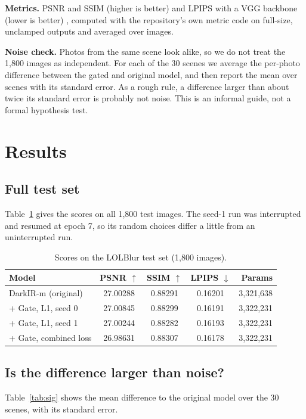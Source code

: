 \documentclass[conference]{IEEEtran}
\begin{document}
\textbf{Metrics.} PSNR and SSIM (higher is better) \cite{ssim} and LPIPS with a VGG backbone (lower is better) \cite{lpips}, computed with the repository's own metric code on full-size, unclamped outputs and averaged over images.

\textbf{Noise check.} Photos from the same scene look alike, so we do not treat the 1{,}800 images as independent. For each of the 30 scenes we average the per-photo difference between the gated and original model, and then report the mean over scenes with its standard error. As a rough rule, a difference larger than about twice its standard error is probably not noise. This is an informal guide, not a formal hypothesis test.

\section{Results}
\subsection{Full test set}
Table~\ref{tab:main} gives the scores on all 1{,}800 test images. The seed-1 run was interrupted and resumed at epoch 7, so its random choices differ a little from an uninterrupted run.

\begin{table}[t]
\caption{Scores on the LOLBlur test set (1{,}800 images).}
\label{tab:main}
\centering
\footnotesize
\setlength{\tabcolsep}{3.5pt}
\begin{tabular}{lcccr}
\toprule
Model & PSNR $\uparrow$ & SSIM $\uparrow$ & LPIPS $\downarrow$ & Params \\
\midrule
DarkIR-m (original) & 27.00288 & 0.88291 & 0.16201 & 3,321,638 \\
+ Gate, L1, seed 0 & 27.00845 & 0.88299 & 0.16191 & 3,322,231 \\
+ Gate, L1, seed 1 & 27.00244 & 0.88282 & 0.16193 & 3,322,231 \\
+ Gate, combined loss & 26.98631 & 0.88307 & 0.16178 & 3,322,231 \\
\bottomrule
\end{tabular}
\end{table}

\subsection{Is the difference larger than noise?}
Table~\ref{tab:sig} shows the mean difference to the original model over the 30 scenes, with its standard error.
\end{document}
